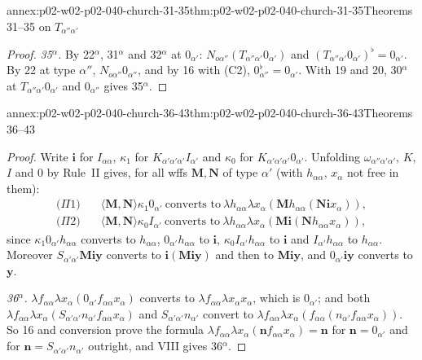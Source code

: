 \begin{annexitem}{annex:p02-w02-p02-040-church-31-35}{thm:p02-w02-p02-040-church-31-35}{Theorems 31--35 on \(T_{\alpha''\alpha'}\)}
\begin{proof}
\emph{35\(^\alpha\).}  By 22\(^\alpha\), 31\(^\alpha\) and 32\(^\alpha\) at
\(0_{\alpha'}\): \(N_{o\alpha''}(T_{\alpha''\alpha'}0_{\alpha'})\) and
\((T_{\alpha''\alpha'}0_{\alpha'})^\flat=0_{\alpha'}\).  By 22 at type \(\alpha''\),
\(N_{o\alpha''}0_{\alpha''}\), and by 16 with (C2),
\(0_{\alpha''}^\flat=0_{\alpha'}\).  With 19 and 20, 30\(^\alpha\) at
\(T_{\alpha''\alpha'}0_{\alpha'}\) and \(0_{\alpha''}\) gives 35\(^\alpha\).
\end{proof}
\end{annexitem}

\begin{annexitem}{annex:p02-w02-p02-040-church-36-43}{thm:p02-w02-p02-040-church-36-43}{Theorems 36--43}
\begin{proof}
Write \(\mathbf i\) for \(I_{\alpha\alpha}\), \(\kappa_1\) for
\(K_{\alpha'\alpha'\alpha'}I_{\alpha'}\) and \(\kappa_0\) for
\(K_{\alpha'\alpha'\alpha'}0_{\alpha'}\).  Unfolding
\(\omega_{\alpha''\alpha'\alpha'}\), \(K\), \(I\) and \(0\) by Rule~II gives, for
all wffs \(\mathbf M,\mathbf N\) of type \(\alpha'\) (with \(h_{\alpha\alpha}\),
\(x_\alpha\) not free in them):
\[
\begin{aligned}
 \text{(\(\Pi\)1)}\quad&\langle\mathbf M,\mathbf N\rangle\kappa_1 0_{\alpha'}\ \text{converts to}\
 \lambda h_{\alpha\alpha}\lambda x_\alpha(\mathbf M h_{\alpha\alpha}(\mathbf N\mathbf i x_\alpha)),\\
 \text{(\(\Pi\)2)}\quad&\langle\mathbf M,\mathbf N\rangle\kappa_0 I_{\alpha'}\ \text{converts to}\
 \lambda h_{\alpha\alpha}\lambda x_\alpha(\mathbf M\mathbf i(\mathbf N h_{\alpha\alpha}x_\alpha)),
\end{aligned}
\]
since \(\kappa_1 0_{\alpha'}h_{\alpha\alpha}\) converts to \(h_{\alpha\alpha}\),
\(0_{\alpha'}h_{\alpha\alpha}\) to \(\mathbf i\), \(\kappa_0I_{\alpha'}h_{\alpha\alpha}\)
to \(\mathbf i\) and \(I_{\alpha'}h_{\alpha\alpha}\) to \(h_{\alpha\alpha}\).
Moreover \(S_{\alpha'\alpha'}\mathbf M\mathbf i\mathbf y\) converts to
\(\mathbf i(\mathbf M\mathbf i\mathbf y)\) and then to \(\mathbf M\mathbf i\mathbf y\),
and \(0_{\alpha'}\mathbf i\mathbf y\) converts to \(\mathbf y\).

\emph{36\(^\alpha\).}  \(\lambda f_{\alpha\alpha}\lambda x_\alpha(0_{\alpha'}f_{\alpha\alpha}x_\alpha)\)
converts to \(\lambda f_{\alpha\alpha}\lambda x_\alpha x_\alpha\), which is
\(0_{\alpha'}\); and both
\(\lambda f_{\alpha\alpha}\lambda x_\alpha(S_{\alpha'\alpha'}n_{\alpha'}f_{\alpha\alpha}x_\alpha)\)
and \(S_{\alpha'\alpha'}n_{\alpha'}\) convert to
\(\lambda f_{\alpha\alpha}\lambda x_\alpha(f_{\alpha\alpha}(n_{\alpha'}f_{\alpha\alpha}x_\alpha))\).
So 16 and conversion prove the formula
\(\lambda f_{\alpha\alpha}\lambda x_\alpha(\mathbf nf_{\alpha\alpha}x_\alpha)=\mathbf n\)
for \(\mathbf n=0_{\alpha'}\) and for \(\mathbf n=S_{\alpha'\alpha'}n_{\alpha'}\)
outright, and VIII gives 36\(^\alpha\).


\end{proof}
\end{annexitem}
